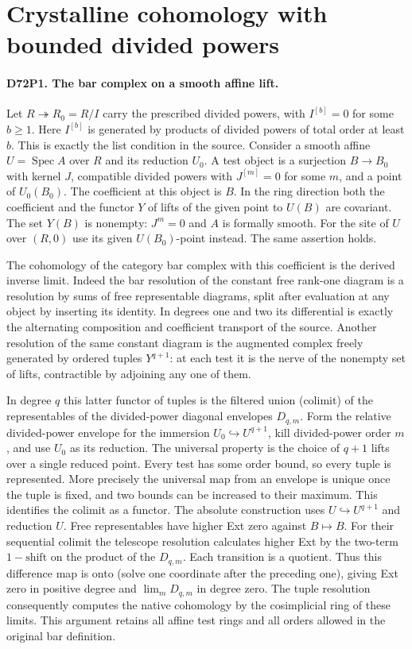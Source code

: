 \section{Crystalline cohomology with bounded divided powers}

\paragraph{D72P1. The bar complex on a smooth affine lift.}
Let $R\twoheadrightarrow R_0=R/I$ carry the prescribed divided
powers, with $I^{[b]}=0$ for some $b\ge1$. Here $I^{[b]}$ is
generated by products of divided powers of total order at least $b$.
This is exactly the list condition in the source. Consider a smooth
affine $U=\operatorname{Spec}A$ over $R$ and its reduction $U_0$.
A test object is a surjection $B\to B_0$ with kernel $J$, compatible
divided powers with $J^{[m]}=0$ for some $m$, and a point of $U_0(B_0)$.
The coefficient at this object is $B$. In the ring direction both the
coefficient and the functor $Y$ of lifts of the given point to $U(B)$
are covariant. The set $Y(B)$ is nonempty: $J^m=0$ and $A$ is formally
smooth. For the site of $U$ over $(R,0)$ use its given $U(B_0)$-point
instead. The same assertion holds.

The cohomology of the category bar complex with this coefficient is
the derived inverse limit. Indeed the bar resolution of the constant
free rank-one diagram is a resolution by sums of free representable
diagrams, split after evaluation at any object by inserting its identity.
In degrees one and two its differential is exactly the alternating
composition and coefficient transport of the source. Another
resolution of the same constant diagram is the augmented complex
freely generated by ordered tuples $Y^{q+1}$: at each test it is the
nerve of the nonempty set of lifts, contractible by adjoining any one
of them.

In degree $q$ this latter functor of tuples is the filtered union
(colimit) of the representables of the divided-power diagonal envelopes
$D_{q,m}$. Form the relative divided-power envelope for the immersion
$U_0\hookrightarrow U^{q+1}$, kill divided-power order $m$, and use
$U_0$ as its reduction. The universal property is the choice of $q+1$
lifts over a single reduced point. Every test has some order bound,
so every tuple is represented. More precisely the universal map from an
envelope is unique once the tuple is fixed, and two bounds can be
increased to their maximum. This identifies the colimit as a functor.
The absolute construction uses
$U\hookrightarrow U^{q+1}$ and reduction $U$. Free representables
have higher Ext zero against $B\mapsto B$. For their sequential
colimit the telescope resolution calculates higher Ext by the
two-term $1-\mathrm{shift}$ on the product of the $D_{q,m}$.
Each transition is a quotient. Thus this difference map is onto
(solve one coordinate after the preceding one), giving Ext zero in
positive degree and $\lim_m D_{q,m}$ in degree zero. The tuple
resolution consequently computes the native cohomology by the
cosimplicial ring of these limits. This argument retains all affine
test rings and all orders allowed in the original bar definition.

